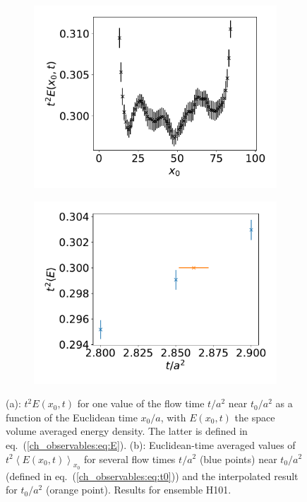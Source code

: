 \begin{figure}
    \begin{subfigure}{1.\textwidth}
    	\includegraphics[width=\textwidth]{./cap3/figs/t2E_H101_plat.pdf}
    	\caption{}
    \end{subfigure}
    \begin{subfigure}{1.\textwidth}
    	\includegraphics[width=\textwidth]{./cap3/figs/t0_H101.pdf}
    	\caption{}
    \end{subfigure}
    \caption{(a): $t^2E(x_0,t)$ for one value of the flow time $t/a^2$ near $t_0/a^2$ as a function of the Euclidean time $x_0/a$, with $E(x_0,t)$ the space volume averaged energy density. The latter is defined in eq.~(\ref{ch_observables:eq:E}). (b): Euclidean-time averaged values of $t^2\left<E(x_0,t)\right>_{x_0}$ for several flow times $t/a^2$ (blue points) near $t_0/a^2$ (defined in eq.~(\ref{ch_observables:eq:t0})) and the interpolated result for $t_0/a^2$ (orange point). Results for ensemble H101.}
        \label{ch_observables:fig:t2E}
\end{figure}

